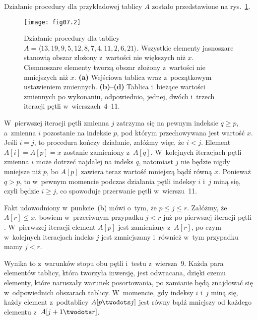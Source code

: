 \problems


\subproblem %
Działanie procedury  dla przykładowej tablicy $A$ zostało przedstawione na rys.~\ref{fig:7-1a}.
\begin{figure}[ht]
	\begin{center}
		\texttt{[image: fig07.2]}
	\end{center}
	\caption{Działanie procedury  dla tablicy $A=\langle13,19,9,5,12,8,7,4,11,2,6,21\rangle$. Wszystkie elementy jasnoszare stanowią obszar złożony z~wartości nie większych niż $x$. Ciemnoszare elementy tworzą obszar złożony z~wartości nie mniejszych niż $x$. {\sffamily\bfseries(a)} Wejściowa tablica wraz z~początkowym ustawieniem zmiennych. {\sffamily\bfseries(b)}--{\sffamily\bfseries(d)} Tablica i~bieżące wartości zmiennych po wykonaniu, odpowiednio, jednej, dwóch i~trzech iteracji pętli  w~wierszach~4--11.} \label{fig:7-1a}
\end{figure}

\subproblem %
W~pierwszej iteracji pętli  zmienna $j$ zatrzyma się na pewnym indeksie $q\ge p$, a~zmienna $i$ pozostanie na indeksie $p$, pod którym przechowywana jest wartość $x$. Jeśli $i=j$, to procedura kończy działanie, załóżmy więc, że $i<j$. Element $A[i]=A[p]=x$ zostanie zamieniony z~$A[q]$. W~kolejnych iteracjach pętli  zmienna $i$ może dotrzeć najdalej na indeks $q$, natomiast $j$ nie będzie nigdy mniejsze niż $p$, bo $A[p]$ zawiera teraz wartość mniejszą bądź równą $x$. Ponieważ $q>p$, to w~pewnym momencie podczas działania pętli indeksy $i$ i~$j$ miną się, czyli będzie $i\ge j$, co spowoduje przerwanie pętli w~wierszu~11.

\subproblem %
Fakt udowodniony w~punkcie~(b) mówi o~tym, że $p\le j\le r$. Załóżmy, że $A[r]\le x$, bowiem w~przeciwnym przypadku $j<r$ już po pierwszej iteracji pętli . W~pierwszej iteracji element $A[p]$ jest zamieniany z~$A[r]$, po czym w~kolejnych iteracjach indeks $j$ jest zmniejszany i~również w~tym przypadku mamy $j<r$.

\subproblem %
Wynika to z~warunków stopu obu pętli  i~testu z~wiersza~9. Każda para elementów tablicy, która tworzyła inwersję, jest odwracana, dzięki czemu elementy, które naruszały warunek posortowania, po zamianie będą znajdować się w~odpowiednich obszarach tablicy. W~momencie, gdy indeksy $i$ i~$j$ miną się, każdy element z~podtablicy $A[p\twodots j]$ jest równy bądź mniejszy od każdego elementu z~$A[j+1\twodots r]$.


